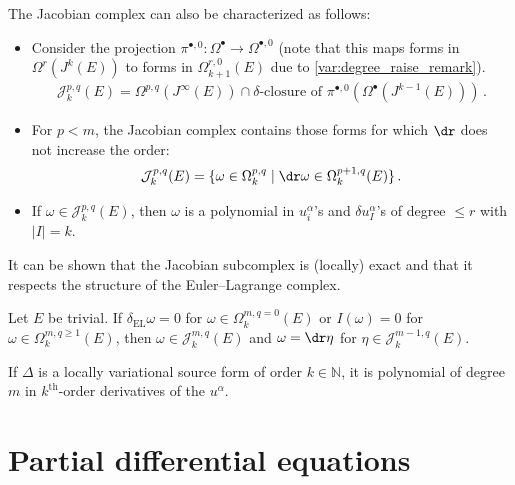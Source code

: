     \begin{property}
        The Jacobian complex can also be characterized as follows:
        \begin{itemize}
            \item Consider the projection $\pi^{\bullet,0}:\Omega^\bullet\rightarrow\Omega^{\bullet,0}$ (note that this maps forms in $\Omega^r(J^k(E))$ to forms in $\Omega^{r,0}_{k+1}(E)$ due to \cref{var:degree_raise_remark}).
            \begin{gather}
                \mathcal{J}^{p,q}_k(E) = \Omega^{p,q}(J^\infty(E))\cap\delta\text{-closure of }\pi^{\bullet,0}\left(\Omega^\bullet(J^{k-1}(E))\right)\,.
            \end{gather}
            \item For $p<m$, the Jacobian complex contains those forms for which $\dr$ does not increase the order:
            \begin{gather}
                \mathcal{J}^{p,q}_k(E) = \{\omega\in\Omega^{p,q}_k\mid\dr\omega\in\Omega^{p+1,q}_k(E)\}\,.
            \end{gather}
            \item If $\omega\in\mathcal{J}^{p,q}_k(E)$, then $\omega$ is a polynomial in $u^\alpha_i$'s and $\delta u^\alpha_I$'s of degree $\leq r$ with $|I|=k$.
        \end{itemize}
    \end{property}

    It can be shown that the Jacobian subcomplex is (locally) exact and that it respects the structure of the Euler--Lagrange complex.
    \begin{property}[Exactness]
        Let $E$ be trivial. If $\delta_{\text{EL}}\omega=0$ for $\omega\in\Omega^{m,q=0}_k(E)$ or $I(\omega)=0$ for $\omega\in\Omega^{m,q\geq1}_k(E)$, then $\omega\in\mathcal{J}^{m,q}_k(E)$ and $\omega=\dr\eta$ for $\eta\in\mathcal{J}^{m-1,q}_k(E)$.
    \end{property}

    \begin{property}
        If $\Delta$ is a locally variational source form of order $k\in\mathbb{N}$, it is polynomial of degree $m$ in $k^{\text{th}}$-order derivatives of the $u^\alpha$.
    \end{property}

\section{Partial differential equations}\label{section:pde_variational}

